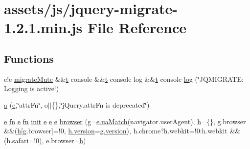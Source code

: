 \hypertarget{jquery-migrate-1_82_81_8min_8js}{}\section{assets/js/jquery-\/migrate-\/1.2.1.min.\+js File Reference}
\label{jquery-migrate-1_82_81_8min_8js}
\subsection*{Functions}
\begin{DoxyCompactItemize}
\item 
e!e \hyperlink{jquery-migrate-1_82_81_8min_8js_ae195c77203e798bee6ede6c8c76c56ae}{migrate\+Mute} \&\&\hyperlink{jquery_8nanoscroller_8min_8js_aaccc9105df5383111407fd5b41255e23}{t} console \&\&\hyperlink{jquery_8nanoscroller_8min_8js_aaccc9105df5383111407fd5b41255e23}{t} console log \&\&\hyperlink{jquery_8nanoscroller_8min_8js_aaccc9105df5383111407fd5b41255e23}{t} console \hyperlink{jquery-migrate-1_82_81_8min_8js_aab8655c63335be4154bdc4165547623e}{log} (\char`\"{}J\+Q\+M\+I\+G\+R\+A\+T\+E\+: Logging is active\char`\"{})
\item 
\hyperlink{jquery-migrate-1_82_81_8min_8js_af314935beaa8ea5cda1aa9bfb7e046b5}{a} (\hyperlink{spin_8min_8js_ad61019675a546296be52534d8b2ac577}{e},\char`\"{}attr\+Fn\char`\"{}, o$\vert$$\vert$\{\},\char`\"{}j\+Query.\+attr\+Fn is deprecated\char`\"{})
\item 
\hyperlink{spin_8min_8js_ad61019675a546296be52534d8b2ac577}{e} \hyperlink{jquery-2_81_83_8min_8js_a4f0af84f62a6e2f4aee1d072192b48ec}{fn} \hyperlink{spin_8min_8js_ad61019675a546296be52534d8b2ac577}{e} \hyperlink{jquery-2_81_83_8min_8js_a4f0af84f62a6e2f4aee1d072192b48ec}{fn} \hyperlink{ec2c8835c9f9fbb7b8cd36464b491e73_8js_a1010d9b42a8d2a138b08570c576977a9}{init} \hyperlink{spin_8min_8js_ad61019675a546296be52534d8b2ac577}{e} \hyperlink{spin_8min_8js_ad61019675a546296be52534d8b2ac577}{e} \hyperlink{spin_8min_8js_ad61019675a546296be52534d8b2ac577}{e} \hyperlink{jquery-migrate-1_82_81_8min_8js_acc1ba4586242adc2e962ab3f4b55f78b}{browser} (\hyperlink{spin_8min_8js_a91a7fe13a3549a399f3a85067bee2e52}{g}=\hyperlink{jquery-migrate-1_82_81_8min_8js_a83209627bbcd8e472c524d831c48cb9b}{e.\+ua\+Match}(navigator.\+user\+Agent), \hyperlink{spin_8min_8js_a4578074554ae92302960c9a6d70b7dda}{h}=\{\}, g.\+browser \&\&(\hyperlink{spin_8min_8js_a4578074554ae92302960c9a6d70b7dda}{h}\mbox{[}g.\+browser\mbox{]}=!0, \hyperlink{ec2c8835c9f9fbb7b8cd36464b491e73_8js_a8edbf7677cf01183c69fd1af466b81c6}{h.\+version}=\hyperlink{ec2c8835c9f9fbb7b8cd36464b491e73_8js_a8edbf7677cf01183c69fd1af466b81c6}{g.\+version}), h.\+chrome?h.\+webkit=!0\+:h.\+webkit \&\&(h.\+safari=!0), e.\+browser=\hyperlink{spin_8min_8js_a4578074554ae92302960c9a6d70b7dda}{h})
$$
\end{DoxyCompactItemize}

